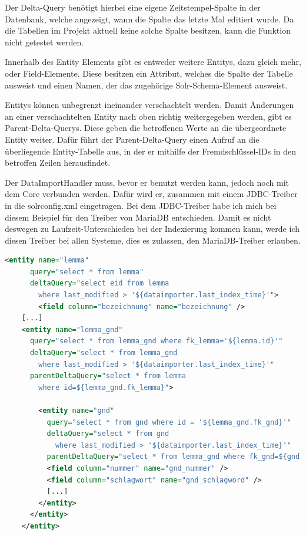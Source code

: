 Der Delta-Query benötigt hierbei eine eigene Zeitstempel-Spalte in der Datenbank, welche angezeigt, wann die Spalte das letzte Mal editiert wurde. Da die Tabellen im Projekt aktuell keine solche Spalte besitzen, kann die Funktion nicht getestet werden.

Innerhalb des Entity Elements gibt es entweder weitere Entitys, dazu gleich mehr, oder Field-Elemente. Diese besitzen ein Attribut, welches die Spalte der Tabelle ausweist und einen Namen, der das zugehörige Solr-Schema-Element ausweist. 

Entitys können unbegrenzt ineinander verschachtelt werden. Damit Änderungen an einer verschachtelten Entity nach oben richtig weitergegeben werden, gibt es Parent-Delta-Querys. Diese geben die betroffenen Werte an die übergeordnete Entity weiter. Dafür führt der Parent-Delta-Query einen Aufruf an die überliegende Entity-Tabelle aus, in der er mithilfe der Fremdschlüssel-IDs in den betroffen Zeilen herausfindet.

Der DataImportHandler muss, bevor er benutzt werden kann, jedoch noch mit dem Core verbunden werden. Dafür wird er, zusammen mit einem JDBC-Treiber in die solrconfig.xml eingetragen. Bei dem JDBC-Treiber habe ich mich bei diesem Beispiel für den Treiber von MariaDB entschieden. Damit es nicht deswegen zu Laufzeit-Unterschieden bei der Indexierung kommen kann, werde ich diesen Treiber bei allen Systeme, dies es zulassen, den MariaDB-Treiber erlauben.

\begin{lstlisting}[language=xml, frame=single, label={lst:dih}, 
    morekeywords={entity,query,deltaQuery,parentDeltaQuery,field,column, name}] 
    <entity name="lemma" 
      query="select * from lemma" 
      deltaQuery="select eid from lemma 
        where last_modified > '${dataimporter.last_index_time}'"> 
		<field column="bezeichnung" name="bezeichnung" />
    [...]
    <entity name="lemma_gnd" 
      query="select * from lemma_gnd where fk_lemma='${lemma.id}'"
      deltaQuery="select * from lemma_gnd 
        where last_modified > '${dataimporter.last_index_time}'"
      parentDeltaQuery="select * from lemma 
        where id=${lemma_gnd.fk_lemma}">
			
        <entity name="gnd" 
          query="select * from gnd where id = '${lemma_gnd.fk_gnd}'"
          deltaQuery="select * from gnd 
            where last_modified > '${dataimporter.last_index_time}'"
          parentDeltaQuery="select * from lemma_gnd where fk_gnd=${gnd.id}">
          <field column="nummer" name="gnd_nummer" />
          <field column="schlagwort" name="gnd_schlagword" />
          [...]
        </entity>
      </entity>  
    </entity>
\end{lstlisting}

